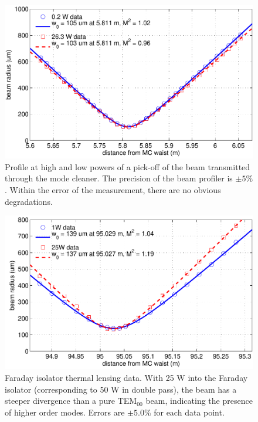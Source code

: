 \begin{figure}
\begin{centering}
\includegraphics[width=1.0\columnwidth]{figures/MCTrans_datafit.pdf}
\caption[Profile at high and low powers of mode cleaner transmitted
beam]{Profile at high and low powers of a pick-off of the beam
  transmitted through the mode cleaner. The precision of the beam
  profiler is $\pm 5\%$. Within the error of the measurement, there
  are no obvious degradations.}
\label{fig:MC_lensing}
\end{centering}
\end{figure}

\begin{figure}
\begin{centering}
\includegraphics[width=1.0\columnwidth]{figures/REFL_datafit.pdf}
\caption[Faraday isolator thermal lensing data]{Faraday isolator
  thermal lensing data. With 25 W into the Faraday isolator
  (corresponding to 50 W in double pass), the beam has a steeper
  divergence than a pure TEM$_{00}$ beam, indicating the presence of
  higher order modes. Errors are $\pm 5.0\%$ for each data point.}
\label{fig:FI_lensing}
\end{centering}
\end{figure}

